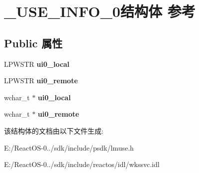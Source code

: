 \hypertarget{struct___u_s_e___i_n_f_o__0}{}\section{\+\_\+\+U\+S\+E\+\_\+\+I\+N\+F\+O\+\_\+0结构体 参考}
\label{struct___u_s_e___i_n_f_o__0}
\subsection*{Public 属性}
\begin{DoxyCompactItemize}
\item 
\mbox{\label{struct___u_s_e___i_n_f_o__0_af3ffa147f9cfe10c1aee89032c9d014d}} 
L\+P\+W\+S\+TR {\bfseries ui0\+\_\+local}
\item 
\mbox{\label{struct___u_s_e___i_n_f_o__0_ac37823d89e476ce20bb765fee87c8312}} 
L\+P\+W\+S\+TR {\bfseries ui0\+\_\+remote}
\item 
\mbox{\label{struct___u_s_e___i_n_f_o__0_acea2c67c3297b8f63a788e70e238fd7e}} 
wchar\+\_\+t $\ast$ {\bfseries ui0\+\_\+local}
\item 
\mbox{\label{struct___u_s_e___i_n_f_o__0_a1bb66bac18d66888762c6c4e33a69323}} 
wchar\+\_\+t $\ast$ {\bfseries ui0\+\_\+remote}
\end{DoxyCompactItemize}


该结构体的文档由以下文件生成\+:\begin{DoxyCompactItemize}
\item 
E\+:/\+React\+O\+S-\/0../sdk/include/psdk/lmuse.\+h\item 
E\+:/\+React\+O\+S-\/0../sdk/include/reactos/idl/wkssvc.\+idl\end{DoxyCompactItemize}
